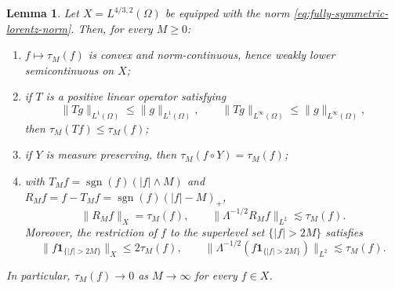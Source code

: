 \documentclass[11pt,reqno]{amsproc}
\newtheorem{lemma}{Lemma}[section]
\newcommand{\Om}{\Omega}
\newcommand{\one}{\mathbf 1}
\newcommand{\Lam}{\Lambda}
\begin{document}
\begin{lemma}\label{lem:tail}
Let $X=L^{4/3,2}(\Om)$ be equipped with the norm
\eqref{eq:fully-symmetric-lorentz-norm}.  Then, for every $M\geq0$:
\begin{enumerate}[label=\textup{(\roman*)}]
\item $f\mapsto\tau_M(f)$ is convex and norm-continuous, hence weakly lower
semicontinuous on $X$;
\item if $T$ is a positive linear operator satisfying
\[
 \|Tg\|_{L^1(\Om)}\leq\|g\|_{L^1(\Om)},
 \qquad
 \|Tg\|_{L^\infty(\Om)}\leq\|g\|_{L^\infty(\Om)},
\]
then $\tau_M(Tf)\leq\tau_M(f)$;
\item if $Y$ is measure preserving, then
$\tau_M(f\circ Y)=\tau_M(f)$;
\item with
$T_Mf=\operatorname{sgn}(f)(|f|\wedge M)$ and
$R_Mf=f-T_Mf=\operatorname{sgn}(f)(|f|-M)_+$,
\begin{equation}\label{eq:tail-estimate}
 \|R_Mf\|_X=\tau_M(f),
 \qquad \|\Lam^{-1/2}R_Mf\|_{L^2}\lesssim\tau_M(f).
\end{equation}
Moreover, the restriction of $f$ to the superlevel set
$\{|f|>2M\}$ satisfies
\begin{equation}
 \|f\one_{\{|f|>2M\}}\|_X\leq2\tau_M(f),
 \qquad
 \|\Lam^{-1/2}(f\one_{\{|f|>2M\}})\|_{L^2}
 \lesssim\tau_M(f).
 \label{eq:hard-tail-by-modulus}
\end{equation}
\end{enumerate}
In particular, $\tau_M(f)\to0$ as $M\to\infty$ for every $f\in X$.
\end{lemma}
\end{document}
